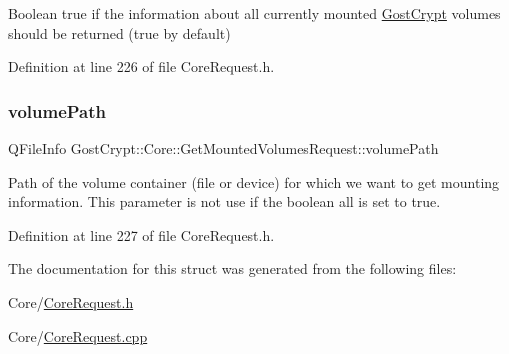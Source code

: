 Boolean true if the information about all currently mounted \hyperlink{namespace_gost_crypt}{Gost\+Crypt} volumes should be returned (true by default) 

Definition at line 226 of file Core\+Request.\+h.

\mbox{\label{struct_gost_crypt_1_1_core_1_1_get_mounted_volumes_request_a35dd833582b8801245d0dd61f31907cb}} 
\subsubsection{\texorpdfstring{volume\+Path}{volumePath}}
{\footnotesize\ttfamily Q\+File\+Info Gost\+Crypt\+::\+Core\+::\+Get\+Mounted\+Volumes\+Request\+::volume\+Path}

Path of the volume container (file or device) for which we want to get mounting information. This parameter is not use if the boolean all is set to true. 

Definition at line 227 of file Core\+Request.\+h.



The documentation for this struct was generated from the following files\+:\begin{DoxyCompactItemize}
\item 
Core/\hyperlink{_core_request_8h}{Core\+Request.\+h}\item 
Core/\hyperlink{_core_request_8cpp}{Core\+Request.\+cpp}\end{DoxyCompactItemize}

